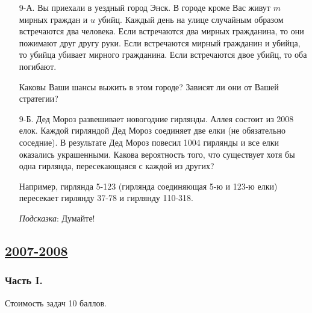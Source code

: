 \begin{enumerate}
\item[9-А.] Вы приехали в уездный город Энск. В городе кроме Вас живут $m$ мирных
граждан и $u$ убийц. Каждый день на улице случайным образом встречаются два человека.
Если встречаются два мирных гражданина, то они пожимают друг другу руки. Если
встречаются мирный гражданин и убийца, то убийца убивает мирного гражданина. Если
встречаются двое убийц, то оба погибают.

Каковы Ваши шансы выжить в этом городе? Зависят ли они от Вашей стратегии?

\item[9-Б.] Дед Мороз развешивает новогодние гирлянды. Аллея состоит из 2008 елок.
Каждой гирляндой Дед Мороз соединяет две елки (не обязательно соседние). В результате
Дед Мороз повесил 1004 гирлянды и все елки оказались украшенными. Какова вероятность
того, что существует хотя бы одна гирлянда, пересекающаяся с каждой из других?

Например, гирлянда 5-123 (гирлянда соединяющая 5-ю и 123-ю елки) пересекает гирлянду
37-78 и гирлянду 110-318.

\emph{Подсказка}: Думайте!
\end{enumerate}




\newpage
\subsection[2007-2008]{\hyperref[sec:sol_kr_02_2007_2008]{2007-2008}}
\label{sec:kr_02_2007_2008}

\subsubsection*{Часть I.}

Стоимость задач 10 баллов.

